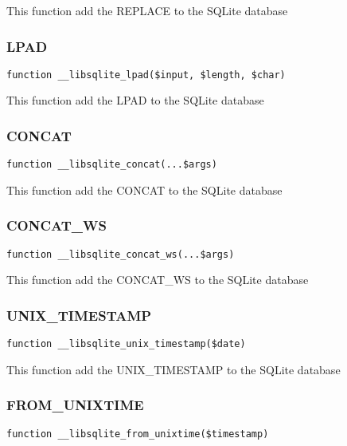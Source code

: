 \documentclass[a4paper]{article}
\begin{document}
This function add the REPLACE to the SQLite database

\hypertarget{toc295}{}
\subsubsection{LPAD}

\begin{lstlisting}
function __libsqlite_lpad($input, $length, $char)
\end{lstlisting}

This function add the LPAD to the SQLite database

\hypertarget{toc296}{}
\subsubsection{CONCAT}

\begin{lstlisting}
function __libsqlite_concat(...$args)
\end{lstlisting}

This function add the CONCAT to the SQLite database

\hypertarget{toc297}{}
\subsubsection{CONCAT\_WS}

\begin{lstlisting}
function __libsqlite_concat_ws(...$args)
\end{lstlisting}

This function add the CONCAT\_WS to the SQLite database

\hypertarget{toc298}{}
\subsubsection{UNIX\_TIMESTAMP}

\begin{lstlisting}
function __libsqlite_unix_timestamp($date)
\end{lstlisting}

This function add the UNIX\_TIMESTAMP to the SQLite database

\hypertarget{toc299}{}
\subsubsection{FROM\_UNIXTIME}

\begin{lstlisting}
function __libsqlite_from_unixtime($timestamp)
\end{lstlisting}
\end{document}
